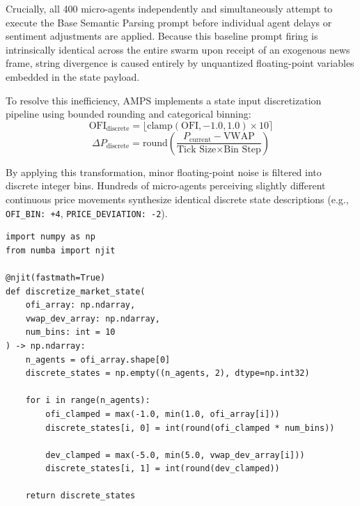 Crucially, all 400 micro-agents independently and simultaneously attempt to execute the Base Semantic Parsing prompt before individual agent delays or sentiment adjustments are applied. Because this baseline prompt firing is intrinsically identical across the entire swarm upon receipt of an exogenous news frame, string divergence is caused entirely by unquantized floating-point variables embedded in the state payload.

To resolve this inefficiency, AMPS implements a state input discretization pipeline using bounded rounding and categorical binning:
\begin{equation}
    \text{OFI}_{\text{discrete}} = \lfloor \text{clamp}(\text{OFI}, -1.0, 1.0) \times 10 \rceil
\end{equation}
\begin{equation}
    \Delta P_{\text{discrete}} = \text{round}\left( \frac{P_{\text{current}} - \text{VWAP}}{\text{Tick Size} \times \text{Bin Step}} \right)
\end{equation}

By applying this transformation, minor floating-point noise is filtered into discrete integer bins. Hundreds of micro-agents perceiving slightly different continuous price movements synthesize identical discrete state descriptions (e.g., \texttt{OFI\_BIN: +4}, \texttt{PRICE\_DEVIATION: -2}).

\vspace{\baselineskip}

\label{listing:discretize_market_state}
\begin{verbatim}
import numpy as np
from numba import njit

@njit(fastmath=True)
def discretize_market_state(
    ofi_array: np.ndarray, 
    vwap_dev_array: np.ndarray, 
    num_bins: int = 10
) -> np.ndarray:
    n_agents = ofi_array.shape[0]
    discrete_states = np.empty((n_agents, 2), dtype=np.int32)
    
    for i in range(n_agents):
        ofi_clamped = max(-1.0, min(1.0, ofi_array[i]))
        discrete_states[i, 0] = int(round(ofi_clamped * num_bins))
        
        dev_clamped = max(-5.0, min(5.0, vwap_dev_array[i]))
        discrete_states[i, 1] = int(round(dev_clamped))
        
    return discrete_states
\end{verbatim}
\par\vspace*{\baselineskip}


